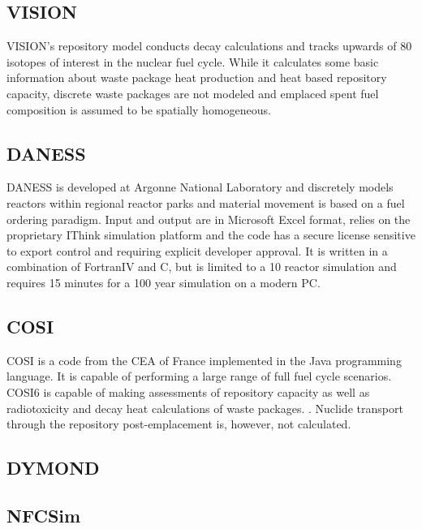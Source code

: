 \subsection{VISION} \gls{VISION}'s repository model conducts decay calculations
and tracks upwards of 80 isotopes of interest in the nuclear fuel cycle.
\cite{yacout_visionverifiable_2006} While it calculates some basic information 
about waste package heat production and heat based repository capacity, discrete  
waste packages are not modeled and emplaced spent fuel composition is assumed to  
be spatially homogeneous.\cite{radel_simulation_2005}
\cite{boucher_international_2010}

\subsection{DANESS} DANESS is developed at Argonne National Laboratory and
discretely models reactors within regional reactor parks and material movement
is based on a fuel ordering paradigm. Input and output are in Microsoft Excel
format, relies on the proprietary IThink simulation platform and the code has a
secure license sensitive to export control and requiring explicit developer
approval. It is written in a combination of FortranIV and C, but is limited to
a 10 reactor simulation and requires 15 minutes for a 100 year simulation on a
modern PC.\cite{yacout_daness_2011,van_den_durpel_daness:_2006} 

\subsection{COSI}

COSI is a code from the CEA of France implemented in the Java programming 
language. It is capable of performing a large range of full fuel cycle 
scenarios. COSI6 is capable of making assessments of repository capacity as 
well as radiotoxicity and decay heat calculations of waste packages. 
\cite{boucher_international_2010}. Nuclide transport through the repository 
post-emplacement is, however, not calculated. 

\subsection{DYMOND}



\subsection{NFCSim}

